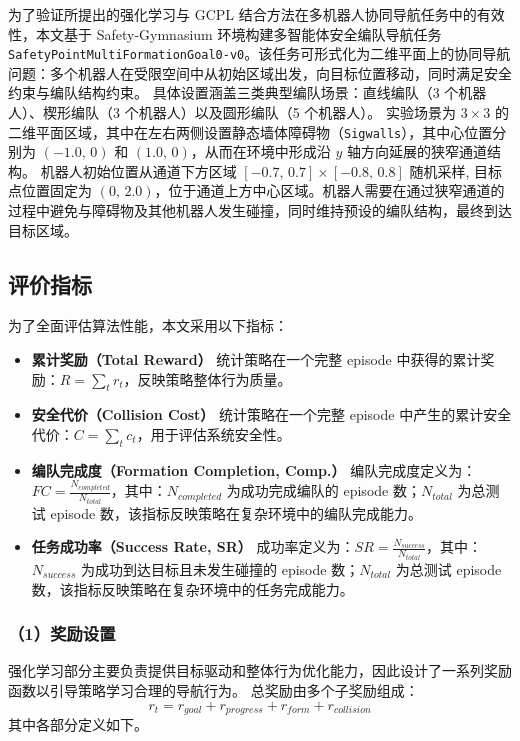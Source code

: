为了验证所提出的强化学习与 GCPL 结合方法在多机器人协同导航任务中的有效性，本文基于 Safety-Gymnasium 环境构建多智能体安全编队导航任务 \texttt{SafetyPointMultiFormationGoal0-v0}。该任务可形式化为二维平面上的协同导航问题：多个机器人在受限空间中从初始区域出发，向目标位置移动，同时满足安全约束与编队结构约束。
具体设置涵盖三类典型编队场景：直线编队（3 个机器人）、楔形编队（3 个机器人）以及圆形编队（5 个机器人）。
实验场景为 $3 \times 3$ 的二维平面区域，其中在左右两侧设置静态墙体障碍物（\texttt{Sigwalls}），其中心位置分别为 $(-1.0,\,0)$ 和 $(1.0,\,0)$，从而在环境中形成沿 $y$ 轴方向延展的狭窄通道结构。
机器人初始位置从通道下方区域 $[-0.7,\,0.7] \times [-0.8,\,0.8]$ 随机采样,
目标点位置固定为 $(0,\,2.0)$，位于通道上方中心区域。机器人需要在通过狭窄通道的过程中避免与障碍物及其他机器人发生碰撞，同时维持预设的编队结构，最终到达目标区域。


\subsection{评价指标}
为了全面评估算法性能，本文采用以下指标：
\begin{itemize}
    \item \textbf{累计奖励（Total Reward）}
    统计策略在一个完整 episode 中获得的累计奖励：$R = \sum_t r_t$，反映策略整体行为质量。
    \item \textbf{安全代价（Collision Cost）}
    统计策略在一个完整 episode 中产生的累计安全代价：$C = \sum_t c_t$，用于评估系统安全性。
    \item \textbf{编队完成度（Formation Completion, Comp.）}
    编队完成度定义为：$FC = \frac{N_{completed}}{N_{total}}$，其中：$N_{completed}$ 为成功完成编队的 episode 数；$N_{total}$ 为总测试 episode 数，该指标反映策略在复杂环境中的编队完成能力。
    \item \textbf{任务成功率（Success Rate, SR）}
    成功率定义为：$SR = \frac{N_{success}}{N_{total}}$，其中：$N_{success}$ 为成功到达目标且未发生碰撞的 episode 数；$N_{total}$ 为总测试 episode 数，该指标反映策略在复杂环境中的任务完成能力。
\end{itemize}

\subsubsection{（1）奖励设置}
强化学习部分主要负责提供目标驱动和整体行为优化能力，因此设计了一系列奖励函数以引导策略学习合理的导航行为。
总奖励由多个子奖励组成：
\[r_t = r_{goal} + r_{progress} + r_{form} + r_{collision}\]
其中各部分定义如下。

